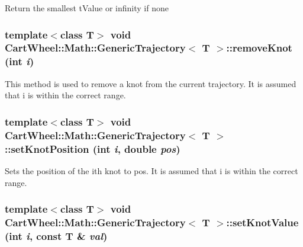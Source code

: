 \label{classCartWheel_1_1Math_1_1GenericTrajectory_ab99de22b373b37caabf9dcaaf6838aca}
Return the smallest tValue or infinity if none \hypertarget{classCartWheel_1_1Math_1_1GenericTrajectory_a8d71a90d3b481f9813a9700557b93cfa}{
\subsubsection[{removeKnot}]{\setlength{\rightskip}{0pt plus 5cm}template$<$class T$>$ void {\bf CartWheel::Math::GenericTrajectory}$<$ T $>$::removeKnot (int {\em i})}}
\label{classCartWheel_1_1Math_1_1GenericTrajectory_a8d71a90d3b481f9813a9700557b93cfa}
This method is used to remove a knot from the current trajectory. It is assumed that i is within the correct range. \hypertarget{classCartWheel_1_1Math_1_1GenericTrajectory_ac084d4f4ff2e617c094a68ff024c83c8}{
\subsubsection[{setKnotPosition}]{\setlength{\rightskip}{0pt plus 5cm}template$<$class T$>$ void {\bf CartWheel::Math::GenericTrajectory}$<$ T $>$::setKnotPosition (int {\em i}, \/  double {\em pos})}}
\label{classCartWheel_1_1Math_1_1GenericTrajectory_ac084d4f4ff2e617c094a68ff024c83c8}
Sets the position of the ith knot to pos. It is assumed that i is within the correct range. \hypertarget{classCartWheel_1_1Math_1_1GenericTrajectory_a9e467a94f7ddb3caada5614dfb801206}{
\subsubsection[{setKnotValue}]{\setlength{\rightskip}{0pt plus 5cm}template$<$class T$>$ void {\bf CartWheel::Math::GenericTrajectory}$<$ T $>$::setKnotValue (int {\em i}, \/  const T \& {\em val})}}
